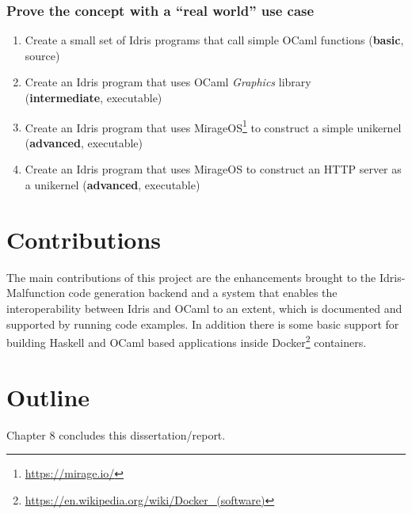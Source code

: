 \subsubsection{Prove the concept with a ``real world'' use case}
\begin{enumerate}
	\item Create a small set of Idris programs that call simple
	      OCaml functions (\textbf{basic}, source)
	\item Create an Idris program that uses OCaml \emph{Graphics}
	      library \\ (\textbf{intermediate}, executable)
	\item Create an Idris program that uses MirageOS\footnote{\url{
			      https://mirage.io/}} to construct a simple
	      unikernel (\textbf{advanced}, executable)
	\item Create an Idris program that uses MirageOS to construct an
	      HTTP server as a unikernel (\textbf{advanced}, executable)
\end{enumerate}



\section{Contributions}
The main contributions of this project are the enhancements brought
to the Idris-Malfunction code generation backend and a
system that enables the interoperability between Idris and OCaml
to an extent, which is documented and supported by running code
examples. In addition there is some basic support for building
Haskell and OCaml based applications inside
Docker\footnote{\url{https://en.wikipedia.org/wiki/Docker_(software)}}
containers.


\section{Outline}
Chapter 8 concludes this dissertation/report.